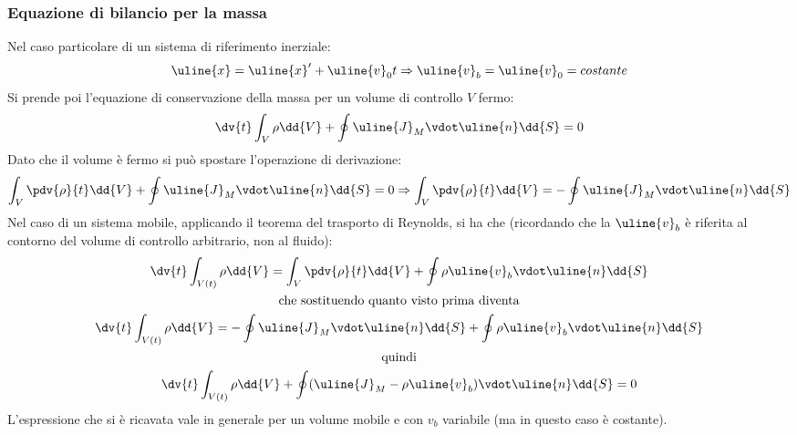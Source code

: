 \subsubsection{Equazione di bilancio per la massa}
Nel caso particolare di un sistema di riferimento inerziale:
%
	\begin{equation*}
		\uline{x} = \uline{x}' + \uline{v}_0 t \Rightarrow \uline{v}_b = \uline{v}_0 = costante 
	\end{equation*}
%
Si prende poi l'equazione di conservazione della massa per un volume di controllo $V$ fermo:
%
	\begin{equation*}
		\dv{t} \int_V \rho \dd{V} + \oint \uline{J}_M \vdot \uline{n} \dd{S} = 0
	\end{equation*}
%
Dato che il volume è fermo si può spostare l'operazione di derivazione:
%
	\begin{equation*}
		\int_V \pdv{\rho}{t} \dd{V} + \oint \uline{J}_M \vdot \uline{n} \dd{S} = 0 \Rightarrow \int_V \pdv{\rho}{t} \dd{V} = - \oint \uline{J}_M \vdot \uline{n} \dd{S}
	\end{equation*}
%
Nel caso di un sistema mobile, applicando il teorema del trasporto di Reynolds, si ha che (ricordando che la $\uline{v}_b$ è riferita al contorno del volume di controllo arbitrario, non al fluido):
%
	\begin{equation*}
		\begin{gathered}
			\dv{t} \int_{V(t)} \rho \dd{V} = \int_V \pdv{\rho}{t} \dd{V} + \oint \rho \uline{v}_b \vdot \uline{n} \dd{S} \\
			\text{che sostituendo quanto visto prima diventa} \\
			\dv{t} \int_{V(t)} \rho \dd{V} =  - \oint \uline{J}_M \vdot \uline{n} \dd{S} + \oint \rho \uline{v}_b \vdot \uline{n} \dd{S}\\
			\text{quindi} \\
			\dv{t} \int_{V(t)} \rho \dd{V} + \oint (\uline{J}_M - \rho \uline{v}_b) \vdot \uline{n} \dd{S} = 0
		\end{gathered}
	\end{equation*}
%
L'espressione che si è ricavata vale in generale per un volume mobile e con $v_b$ variabile (ma in questo caso è costante).

